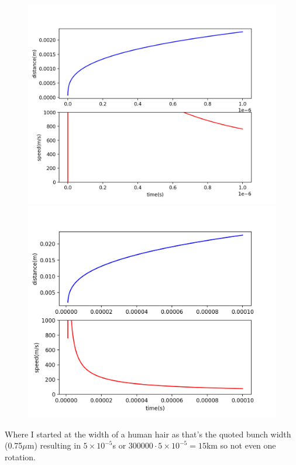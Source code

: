 \documentclass[10pt,a4paper,twoside]{article}
\begin{document}
\begin{figure}[H]
	\includegraphics[width=0.5\linewidth]{Figure_1.png}
	\includegraphics[width=0.5\linewidth]{Figure_2.png}
\end{figure}
\noindent
Where I started at the width of a human hair as that's the quoted bunch width (0.75$\mu$m) resulting in $5\times10^{-5}$s or $300000\cdot5\times10^{-5} = 15$km so not even one rotation.
\end{document}
